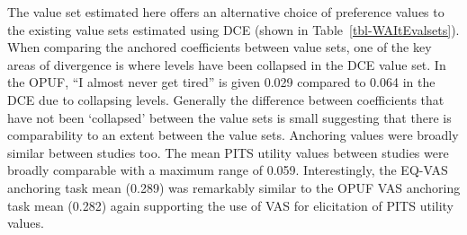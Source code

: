 \documentclass[
  number,
  preprint]{elsarticle}
\begin{document}
The value set estimated here offers an alternative choice of preference
values to the existing value sets estimated using DCE (shown in
Table~\ref{tbl-WAItEvalsets}). When comparing the anchored coefficients
between value sets, one of the key areas of divergence is where levels
have been collapsed in the DCE value set. In the OPUF, ``I almost never
get tired'' is given 0.029 compared to 0.064 in the DCE due to
collapsing levels. Generally the difference between coefficients that
have not been `collapsed' between the value sets is small suggesting
that there is comparability to an extent between the value sets.
Anchoring values were broadly similar between studies too. The mean PITS
utility values between studies were broadly comparable with a maximum
range of 0.059. Interestingly, the EQ-VAS anchoring task mean (0.289)
was remarkably similar to the OPUF VAS anchoring task mean (0.282) again
supporting the use of VAS for elicitation of PITS utility values.
\end{document}
